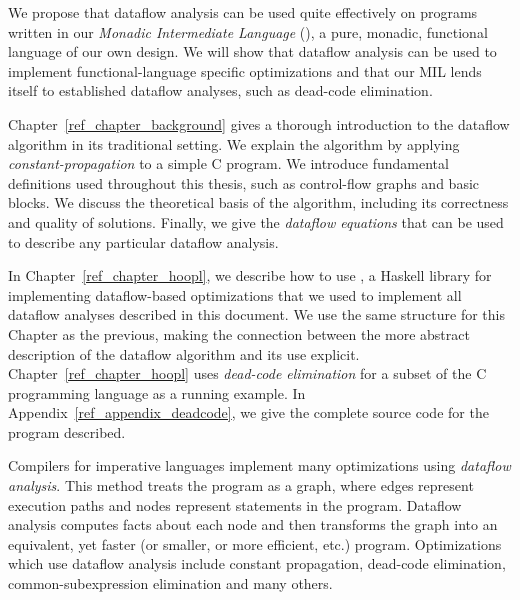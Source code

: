 We propose that dataflow analysis can be used quite effectively on
programs written in our \emph{Monadic Intermediate Language} (\mil), a
pure, monadic, functional language of our own design. We will show
that dataflow analysis can be used to implement functional-language
specific optimizations and that our MIL lends itself to established
dataflow analyses, such as dead-code elimination.

 Chapter~\ref{ref_chapter_background}  gives 
a thorough introduction to the dataflow algorithm in its traditional
setting. We explain the algorithm by
applying \emph{constant-propagation} to a simple C program. We
introduce fundamental definitions used throughout this thesis, such as
control-flow graphs and basic blocks. We discuss the theoretical basis
of the algorithm, including its correctness and quality of
solutions. Finally, we give the \emph{dataflow equations} that can be
used to describe any particular dataflow analysis.

 In Chapter~\ref{ref_chapter_hoopl},
we describe how to use \hoopl \citep{Hoopl-3.8.7.0}, a Haskell library
for implementing dataflow-based optimizations that we used to
implement all dataflow analyses described in this document. We use the
same structure for this Chapter as the previous, making the connection
between the more abstract description of the dataflow algorithm and
its use explicit. Chapter~\ref{ref_chapter_hoopl} uses \emph{dead-code
elimination} for a subset of the C programming language as a running
example. In Appendix~\ref{ref_appendix_deadcode}, we give the complete source
code for the program described.




Compilers for imperative languages implement many optimizations using
\emph{dataflow analysis}. This method treats the program as a graph,
where edges represent execution paths and nodes represent statements
in the program. Dataflow analysis computes facts about each node and
then transforms the graph into an equivalent, yet faster (or smaller,
or more efficient, etc.) program. Optimizations which use dataflow
analysis include constant propagation, dead-code elimination,
common-subexpression elimination and many others.

